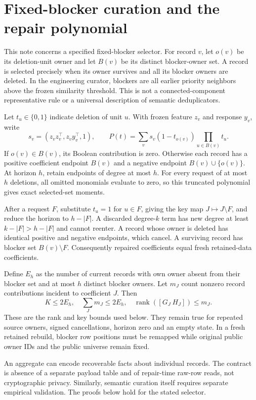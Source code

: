 \documentclass[11pt,a4paper]{article}
\begin{document}
\section{Fixed-blocker curation and the repair polynomial}
This note concerns a specified fixed-blocker selector. For record $v$, let
$o(v)$ be its deletion-unit owner and let $B(v)$ be its distinct blocker-owner
set. A record is selected precisely when its owner survives and all its blocker
owners are deleted. In the engineering curator, blockers are all earlier
priority neighbors above the frozen similarity threshold. This is not a
connected-component representative rule or a universal description of
semantic deduplicators.

Let $t_u\in\{0,1\}$ indicate deletion of unit $u$. With frozen feature $z_v$
and response $y_v$, write
\[
s_v=(z_vz_v^\top,z_vy_v^\top,1),\qquad
P(t)=\sum_v s_v(1-t_{o(v)})\prod_{u\in B(v)}t_u.
\]
If $o(v)\in B(v)$, its Boolean contribution is zero. Otherwise each record
has a positive coefficient endpoint $B(v)$ and a negative endpoint
$B(v)\cup\{o(v)\}$. At horizon $h$, retain endpoints of degree at most $h$.
For every request of at most $h$ deletions, all omitted monomials evaluate to
zero, so this truncated polynomial gives exact selected-set moments.

After a request $F$, substitute $t_u=1$ for $u\in F$, giving the key map
$J\mapsto J\setminus F$, and reduce the horizon to $h-|F|$. A discarded
degree-$k$ term has new degree at least $k-|F|>h-|F|$ and cannot reenter.
A record whose owner is deleted has identical positive and negative endpoints,
which cancel. A surviving record has blocker set $B(v)\setminus F$.
Consequently repaired coefficients equal fresh retained-data coefficients.

Define $E_h$ as the number of current records with own owner absent from their
blocker set and at most $h$ distinct blocker owners. Let $m_J$ count nonzero
record contributions incident to coefficient $J$. Then
\[
K\le 2E_h,\quad \sum_Jm_J\le 2E_h,\quad
\operatorname{rank}([G_J\ H_J])\le m_J.
\]
These are the rank and key bounds used below. They remain true for repeated
source owners, signed cancellations, horizon zero and an empty state. In a
fresh retained rebuild, blocker row positions must be remapped while original
public owner IDs and the public universe remain fixed.

An aggregate can encode recoverable facts about individual records. The
contract is absence of a separate payload table and of repair-time raw-row
reads, not cryptographic privacy. Similarly, semantic curation itself requires
separate empirical validation. The proofs below hold for the stated selector.
\newpage
\end{document}
